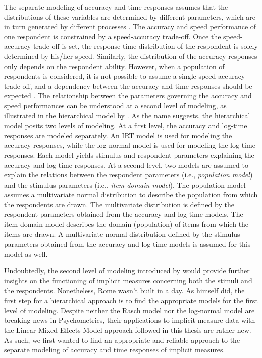 \documentclass[12pt]{book}
\begin{document}
The separate modeling of accuracy and time responses assumes that the distributions of these variables are determined by different parameters, which are in turn generated by different processes \cite{van2006}.   
	The accuracy and speed performance of one respondent is constrained by a speed-accuracy trade-off. 
	Once the speed-accuracy trade-off is set, the response time distribution of the respondent is solely determined by his/her speed. 
	Similarly, the distribution of the accuracy responses only depends on the respondent ability.
	However, when a population of respondents is considered, it is not possible to assume a single speed-accuracy trade-off, and a dependency between the accuracy and time responses should be expected \cite{van2006, VanDerLinden2007}.
	The relationship between the parameters governing the accuracy and speed performances can be understood at a second level of modeling, as illustrated in the hierarchical model by .
	As the name suggests, the hierarchical model posits two levels of modeling. 
	At a first level, the accuracy and log-time responses are modeled separately. An IRT model is used for modeling the accuracy responses, while the log-normal model is used for modeling the log-time responses. 
	Each model yields stimulus and respondent parameters explaining the accuracy and log-time responses.
	At a second level, two models are assumed to explain the relations between the respondent parameters (i.e., \emph{population model}) and the stimulus parameters (i.e., \emph{item-domain model}).   
	The population model assumes a multivariate normal distribution to describe the population from which the respondents are drawn. 
	The multivariate distribution is defined by the respondent parameters obtained from the accuracy and log-time models.
	The item-domain model describes the domain (population) of items from which the items are drawn. A multivariate normal distribution defined by the stimulus parameters obtained from the accuracy and log-time models is assumed for this model as well. 


Undoubtedly, the second level of modeling introduced by  would provide further insights on the functioning of implicit measures concerning both the stimuli and the respondents. Nonetheless, Rome wasn't built in a day.  
	As  himself did, the first step for a hierarchical approach is to find the appropriate models for the first level of modeling. Despite neither the Rasch model nor the log-normal model are breaking news in Psychometrics, their applications to implicit measure data with the Linear Mixed-Effects Model approach followed in this thesis are rather new. 
	As such, we first wanted to find an appropriate and reliable approach to the separate modeling of accuracy and time responses of implicit measures.
\end{document}
